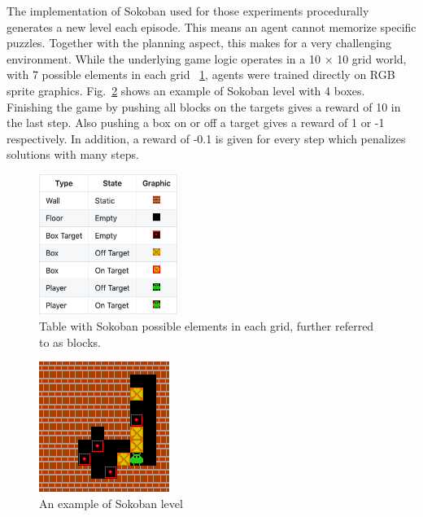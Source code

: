 The implementation of Sokoban used for those experiments procedurally generates a new level each episode. This means an agent cannot memorize specific puzzles. Together with the planning aspect, this makes for a very challenging environment. While the underlying game logic operates in a 10 × 10 grid world, with 7 possible elements in each grid ~\ref{Fig.Sokoban_elements}, agents were trained directly on RGB sprite graphics. Fig.~\ref{Fig.Sokoban} shows an example of Sokoban level with 4 boxes. \\
Finishing the game by pushing all blocks on the targets gives a reward of 10 in the last step. Also pushing a box on or off a target gives a reward of 1 or -1 respectively. In addition, a reward of -0.1 is given for every step which penalizes solutions with many steps.

\begin{figure}[H]
\includegraphics[width=0.4\textwidth,keepaspectratio]{figures/Sokoban_elements.png}
\caption[Sokoban elements]{Table with Sokoban possible elements in each grid, further referred to as blocks.}
\label{Fig.Sokoban_elements}
\end{figure}

\begin{figure}[H]
\includegraphics[]{figures/Sokoban.png}
\caption[Sokoban]{An example of Sokoban level}
\label{Fig.Sokoban}
\end{figure}
